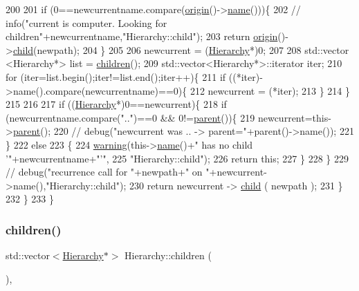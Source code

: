 \begin{DoxyCode}
200 
201       \textcolor{keywordflow}{if} (0==newcurrentname.compare(\hyperlink{classHierarchy_aee461dc930ce3871636ff87f075b1b83}{origin}()->\hyperlink{classObject_a300f4c05dd468c7bb8b3c968868443c1}{name}()))\{
202         \textcolor{comment}{//        info("current is computer. Looking for children"+newcurrentname,"Hierarchy::child");}
203         \textcolor{keywordflow}{return} \hyperlink{classHierarchy_aee461dc930ce3871636ff87f075b1b83}{origin}()->\hyperlink{classHierarchy_a1e207f973c694b538bf90107b4868817}{child}(newpath);
204       \}
205 
206       newcurrent = (\hyperlink{classHierarchy}{Hierarchy}*)0;
207 
208       std::vector <Hierarchy*> list = \hyperlink{classHierarchy_aa9a76f69e98e052ee1a6e32cea006288}{children}();
209       std::vector<Hierarchy*>::iterator iter;
210       \textcolor{keywordflow}{for} (iter=list.begin();iter!=list.end();iter++)\{
211         \textcolor{keywordflow}{if} ((*iter)->name().compare(newcurrentname)==0)\{
212           newcurrent = (*iter);
213         \}
214       \}
215 
216 
217       \textcolor{keywordflow}{if} ((\hyperlink{classHierarchy}{Hierarchy}*)0==newcurrent)\{
218         \textcolor{keywordflow}{if} (newcurrentname.compare(\textcolor{stringliteral}{".."})==0 && 0!=\hyperlink{classHierarchy_a1c7bec8257e717f9c1465e06ebf845fc}{parent}())\{
219           newcurrent=this->\hyperlink{classHierarchy_a1c7bec8257e717f9c1465e06ebf845fc}{parent}();
220           \textcolor{comment}{//          debug("newcurrent was .. -> parent="+parent()->name());}
221         \}
222         \textcolor{keywordflow}{else}
223         \{
224           \hyperlink{classObject_a65cd4fda577711660821fd2cd5a3b4c9}{warning}(this->\hyperlink{classObject_a300f4c05dd468c7bb8b3c968868443c1}{name}()+\textcolor{stringliteral}{" has no child '"}+newcurrentname+\textcolor{stringliteral}{"'"},
225               \textcolor{stringliteral}{"Hierarchy::child"});
226           \textcolor{keywordflow}{return} \textcolor{keyword}{this};
227         \}
228       \}
229       \textcolor{comment}{//      debug("recurrence call for "+newpath+" on "+newcurrent->name(),"Hierarchy::child");}
230       \textcolor{keywordflow}{return} newcurrent -> \hyperlink{classHierarchy_a1e207f973c694b538bf90107b4868817}{child} ( newpath );
231     \}
232   \}
233 \}
\end{DoxyCode}
\mbox{\label{classHierarchy_aa9a76f69e98e052ee1a6e32cea006288}} 
\subsubsection{\texorpdfstring{children()}{children()}}
{\footnotesize\ttfamily std\+::vector$<$\hyperlink{classHierarchy}{Hierarchy}$\ast$$>$ Hierarchy\+::children (\begin{DoxyParamCaption}{ }\end{DoxyParamCaption})\hspace{0.3cm}{\ttfamily [inline]}, {\ttfamily [inherited]}}



